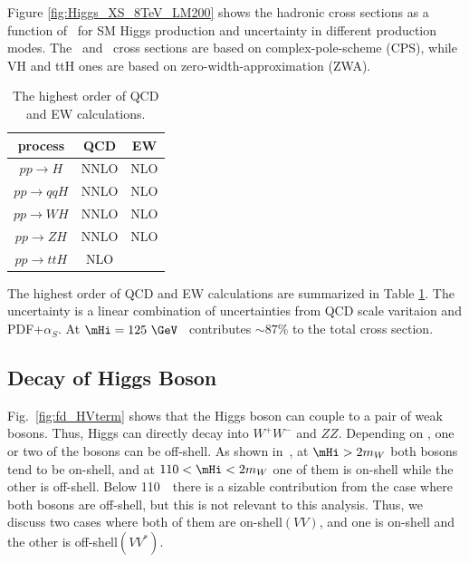 Figure \ref{fig:Higgs_XS_8TeV_LM200} shows the hadronic cross sections 
as a function of \mHi\ for SM Higgs production and uncertainty 
in different production modes. The \ggH\ and \qqH\ cross sections 
are based on complex-pole-scheme (CPS), while VH and ttH ones 
are based on zero-width-approximation (ZWA). 
\begin{table}[htb]
\centering
\begin{tabular}{c c c  }
\hline
process     & QCD   & EW \\
\hline \hline 
$ pp \rightarrow H$         & NNLO  & NLO \\
$ pp \rightarrow qqH$       & NNLO  & NLO \\
$ pp \rightarrow WH$        & NNLO  & NLO \\
$ pp \rightarrow ZH$        & NNLO  & NLO \\
$ pp \rightarrow ttH$       & NLO   &     \\
\hline 
\end{tabular}
\label{tab:Higgs_XS_8TeV_order}
\caption{The highest order of QCD and EW calculations.}
\end{table}
The highest order of QCD and EW calculations are summarized in Table 
\ref{tab:Higgs_XS_8TeV_order}. The uncertainty is a linear combination 
of uncertainties from QCD scale varitaion and PDF+$\alpha_S$.
At $\mHi=125~\GeV$ \ggH\ contributes $\sim 87 \%$ to the total cross section.



\newpage
\subsection{Decay of Higgs Boson}
\label{sec:decayHiggs}

Fig.~\ref{fig:fd_HVterm} shows that the Higgs boson can 
couple to a pair of weak bosons. Thus, Higgs can directly decay into $W^+W^-$ and $ZZ$.
Depending on \mHi, one or two of the bosons can be off-shell. 
As shown in~\cite{Djouadi20081}, at $\mHi>2m_W$ both bosons 
tend to be on-shell, and at $110<\mHi<2m_W$ one of them is on-shell 
while the other is off-shell. Below 110~\GeV\ there is a sizable contribution 
from the case where both bosons are off-shell, but this is not relevant 
to this analysis. Thus, we discuss two cases where both of them are on-shell$(VV)$, 
and one is on-shell and the other is off-shell$(VV^*)$. 

